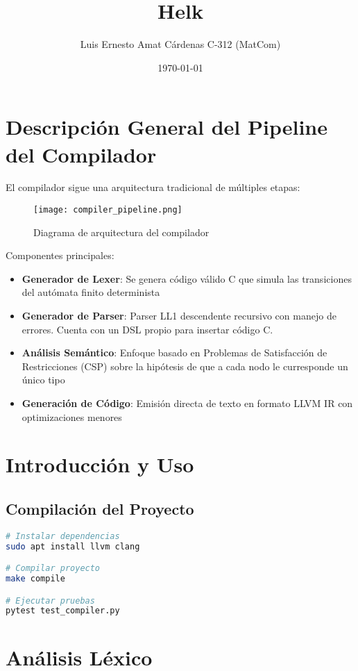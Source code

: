 \documentclass[11pt]{article}
\title{Helk}
\author{Luis Ernesto Amat Cárdenas C-312 (MatCom)}
\date{\today}
\begin{document}
\maketitle

\section{Descripción General del Pipeline del Compilador}
El compilador sigue una arquitectura tradicional de múltiples etapas:

\begin{figure}[h]
\centering
\texttt{[image: compiler\_pipeline.png]}
\caption{Diagrama de arquitectura del compilador}
\end{figure}

Componentes principales:
\begin{itemize}
\item \textbf{Generador de Lexer}: Se genera código válido C que simula las transiciones del autómata finito determinista
\item \textbf{Generador de Parser}: Parser LL1 descendente recursivo con manejo de errores. Cuenta con un DSL propio para insertar código C.
\item \textbf{Análisis Semántico}: Enfoque basado en Problemas de Satisfacción de Restricciones (CSP) sobre la hipótesis de que a cada nodo le curresponde un único tipo
\item \textbf{Generación de Código}: Emisión directa de texto en formato LLVM IR con optimizaciones menores
\end{itemize}

\section{Introducción y Uso}
\subsection{Compilación del Proyecto}
\begin{lstlisting}[language=bash]
# Instalar dependencias
sudo apt install llvm clang

# Compilar proyecto
make compile

# Ejecutar pruebas
pytest test_compiler.py
\end{lstlisting}

\section{Análisis Léxico}
\end{document}
